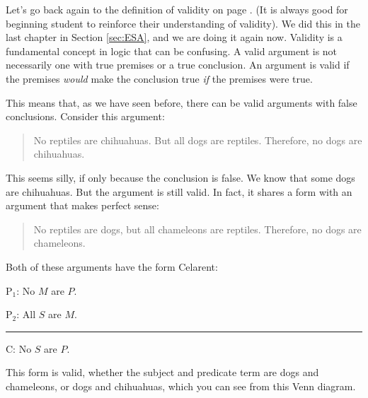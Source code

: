 Let's go back again to the definition of validity on page \pageref{def:valid}. (It is always good for beginning student to reinforce their understanding of validity). We did this in the last chapter in Section \ref{sec:ESA}, and we are doing it again now. \label{valid_definition_reinforcement} Validity is a fundamental concept in logic that can be confusing. A valid argument is not necessarily one with true premises or a true conclusion. An argument is valid if the premises \emph{would} make the conclusion true \emph{if} the premises were true.

This means that, as we have seen before, there can be valid arguments with false conclusions. Consider this argument:

\begin{quotation}\noindent No reptiles are chihuahuas. But all dogs are reptiles. Therefore, no dogs are chihuahuas. \end{quotation}

This seems silly, if only because the conclusion is false. We know that some dogs are chihuahuas. But the argument is still valid. In fact, it shares a form with an argument that makes perfect sense:

\begin{quotation}\noindent No reptiles are dogs, but all chameleons are reptiles. Therefore, no dogs are chameleons. \end{quotation} 

Both of these arguments have the form Celarent: 

\begin{earg}
\item[P$_1$:] No $M$ are $P$.
\item[P$_2$:] All $S$ are $M$.
\vspace{-.5em}
\item [] \rule{0.15\linewidth}{.5pt} 
\item[C:] No $S$ are $P$.
\end{earg} 

This form is valid, whether the subject and predicate term are dogs and chameleons, or dogs and chihuahuas, which you can see from this Venn diagram.

\begin{center}
\end{center}

